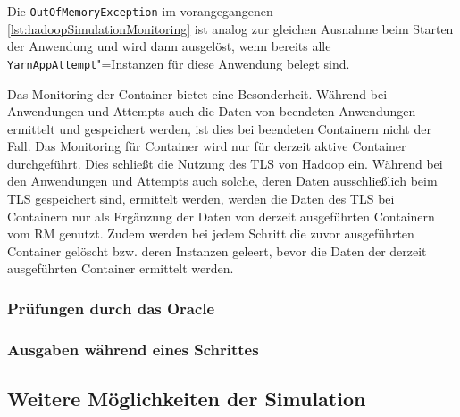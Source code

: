 Die \texttt{OutOfMemoryException} im vorangegangenen \autoref{lst:hadoopSimulationMonitoring} ist analog zur gleichen Ausnahme beim Starten der Anwendung und wird dann ausgelöst, wenn bereits alle \texttt{YarnAppAttempt}"=Instanzen für diese Anwendung belegt sind.

Das Monitoring der Container bietet eine Besonderheit.
Während bei Anwendungen und Attempts auch die Daten von beendeten Anwendungen ermittelt und gespeichert werden, ist dies bei beendeten Containern nicht der Fall.
Das Monitoring für Container wird nur für derzeit aktive Container durchgeführt.
Dies schließt die Nutzung des \ac{TLS} von Hadoop ein.
Während bei den Anwendungen und Attempts auch solche, deren Daten ausschließlich beim \ac{TLS} gespeichert sind, ermittelt werden, werden die Daten des \ac{TLS} bei Containern nur als Ergänzung der Daten von derzeit ausgeführten Containern vom \ac{RM} genutzt.
Zudem werden bei jedem Schritt die zuvor ausgeführten Container gelöscht bzw. deren Instanzen geleert, bevor die Daten der derzeit ausgeführten Container ermittelt werden.

\subsubsection{Prüfungen durch das Oracle}\label{sec:simulationOracle}


\subsubsection{Ausgaben während eines Schrittes}\label{sec:simulationStepOutput}


\subsection{Weitere Möglichkeiten der Simulation}\label{sec:simulationUtilities}
